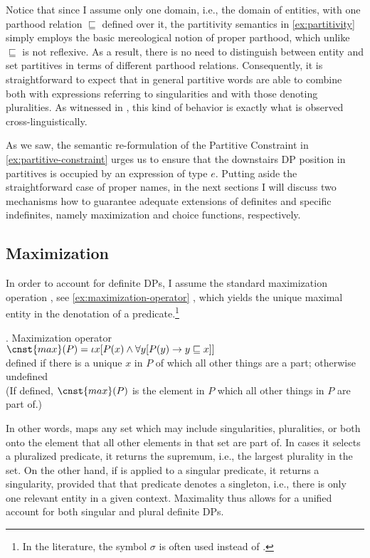 	Notice that since I assume only one domain, i.e., the domain of entities, with one parthood relation $\sqsubseteq$ defined over it, the partitivity semantics in \ref{ex:partitivity} simply employs the basic mereological notion of proper parthood, which unlike $\sqsubseteq$ is not reflexive. As a result, there is no need to distinguish between entity and set partitives in terms of different parthood relations. Consequently, it is straightforward to expect that in general partitive words are able to combine both with expressions referring to singularities and with those denoting pluralities. As witnessed in  , this kind of behavior is exactly what is observed cross-linguistically.
	
	As we saw, the semantic re-formulation of the Partitive Constraint in \ref{ex:partitive-constraint} urges us to ensure that the downstairs DP position in partitives is occupied by an expression of type $e$. Putting aside the straightforward case of proper names, in the next sections I will discuss two mechanisms how to guarantee adequate extensions of definites and specific indefinites, namely maximization and choice functions, respectively.
	
	\subsection{Maximization}\label{sec:maximization}
	
	In order to account for definite DPs, I assume the standard maximization operation , see \ref{ex:maximization-operator} \citep[cf.][]{sharvy1980more,link1983logical}, which yields the unique maximal entity in the denotation of a predicate.\footnote{In the literature, the symbol $\sigma$ is often used instead of .} 
	
	\ex. Maximization operator\\
	$\cnst{max}(P) = \iota x[P(x) \wedge \forall y[P(y) \rightarrow y \sqsubseteq x]]$\\
	defined if there is a unique $x$ in $P$ of which all other  things are a part; otherwise undefined\\
	(If defined, $\cnst{max}(P)$ is the element in $P$ which all other things in $P$ are part of.)\label{ex:maximization-operator}
	
    In other words,  maps any set which may include singularities, pluralities, or both onto the element that all other elements in that set are part of. In cases it selects a pluralized predicate, it returns the supremum, i.e., the largest plurality in the set. On the other hand, if  is applied to a singular predicate, it returns a singularity, provided that that predicate denotes a singleton, i.e., there is only one relevant entity in a given context. Maximality thus allows for a unified account for both singular and plural definite DPs.

